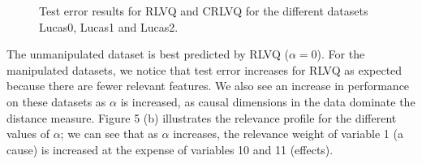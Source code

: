 \documentclass{esannV2}
\begin{document}
\begin{figure}[t]
	\centering
	\caption{Test error results for RLVQ and CRLVQ for the different datasets Lucas0, Lucas1 and Lucas2.}
	\label{tab:TestErrorResults}
\end{figure} 

The unmanipulated dataset is best predicted by RLVQ ($\alpha = 0$). For the manipulated datasets, we notice that test error increases for RLVQ as expected because there are fewer relevant features. We also see an increase in performance on these datasets as $\alpha$ is increased, as causal dimensions in the data dominate the distance measure. Figure 5 (b) illustrates the relevance profile for the different values of $\alpha$; we can see that as $\alpha$ increases, the relevance weight of variable 1 (a cause) is increased at the expense of variables 10 and 11 (effects).

\end{document}
